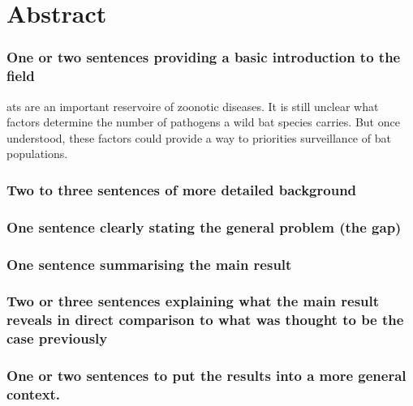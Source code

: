 \clearpage







\section{Abstract}


\subsubsection{One or two sentences providing a basic introduction to the field}
ats are an important reservoire of zoonotic diseases.
It is still unclear what factors determine the number of pathogens a wild bat species carries.
But once understood, these factors could provide a way to priorities surveillance of bat populations.


\subsubsection{Two to three sentences of more detailed background}


\subsubsection{One sentence clearly stating the general problem (the gap)}


\subsubsection{One sentence summarising the main result}


\subsubsection{Two or three sentences explaining what the main result reveals in direct comparison to what was thought to be the case previously}


\subsubsection{One or two sentences to put the results into a more general context.}



